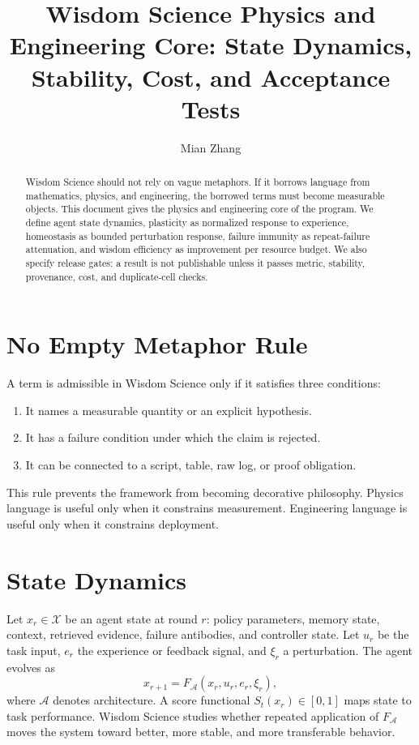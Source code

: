\documentclass[11pt]{article}
\title{Wisdom Science Physics and Engineering Core: State Dynamics, Stability, Cost, and Acceptance Tests}
\author{Mian Zhang}
\date{}
\begin{document}
\maketitle

\begin{abstract}
Wisdom Science should not rely on vague metaphors.
If it borrows language from mathematics, physics, and engineering, the borrowed terms must become measurable objects.
This document gives the physics and engineering core of the program.
We define agent state dynamics, plasticity as normalized response to experience, homeostasis as bounded perturbation response, failure immunity as repeat-failure attenuation, and wisdom efficiency as improvement per resource budget.
We also specify release gates: a result is not publishable unless it passes metric, stability, provenance, cost, and duplicate-cell checks.
\end{abstract}

\section{No Empty Metaphor Rule}

A term is admissible in Wisdom Science only if it satisfies three conditions:
\begin{enumerate}[leftmargin=*]
  \item It names a measurable quantity or an explicit hypothesis.
  \item It has a failure condition under which the claim is rejected.
  \item It can be connected to a script, table, raw log, or proof obligation.
\end{enumerate}

This rule prevents the framework from becoming decorative philosophy.
Physics language is useful only when it constrains measurement.
Engineering language is useful only when it constrains deployment.

\section{State Dynamics}

Let $x_r\in\mathcal{X}$ be an agent state at round $r$: policy parameters, memory state, context, retrieved evidence, failure antibodies, and controller state.
Let $u_r$ be the task input, $e_r$ the experience or feedback signal, and $\xi_r$ a perturbation.
The agent evolves as
\[
x_{r+1}=F_{\mathcal{A}}(x_r,u_r,e_r,\xi_r),
\]
where $\mathcal{A}$ denotes architecture.
A score functional $S_t(x_r)\in[0,1]$ maps state to task performance.
Wisdom Science studies whether repeated application of $F_{\mathcal{A}}$ moves the system toward better, more stable, and more transferable behavior.
\end{document}
